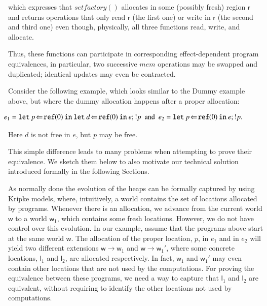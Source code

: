 \documentclass[orivec]{llncs}
\newif\iffull\fullfalse
\renewcommand{\paragraph}[1]{\noindent {\bf #1}}
\newcommand{\keywd}[1]{\mathtt{#1}}
\newcommand{\myref}[1]{\keywd{ref}(#1)}
\newcommand{\letin}[2]{\keywd{let}\:{#1}\!\Leftarrow\!{#2}\:\keywd{in}\:}
\newcommand{\regid}{\ensuremath{\mathsf{r}}}
\newcommand{\cloc}{\ensuremath{\mathsf{l}}\xspace}
\newcommand\w{\ensuremath{\mathsf{w}}\xspace}
\begin{document}
\noindent
which  expresses   that  $\textit{setfactory}()$  allocates   in  some
\fi
(possibly fresh) region $\regid$ and returns operations that only read
$\regid$ (the  first one)  or write  in $\regid$ (the  second and
third one)  even though, physically, all three  functions read, write,
and allocate.


Thus, these functions can participate in corresponding
effect-dependent program equivalences, in particular, two successive
$\textit{mem}$ operations may be swapped and duplicated; identical
updates may even be contracted.
\iffull\footnote{We
could
also consider a more object-oriented variant that works with
a basic type $\textit{set}_\regid$ accepted as argument by the
operations.}
\fi

\paragraph{Interleaved Dummy allocation}
Consider the following example, which looks similar to the Dummy example
above, but where the dummy allocation happens after a proper allocation:
\iffull
\[
\begin{array}{l}
 e_1 = \letin{p}{\myref{0}}\letin{d}{\myref{0}} e; !p ~\textrm{ and }~
 e_2 = \letin{p}{\myref{0}} e; !p.
\end{array} 
\]
Here $d$ is not free in $e$, but $p$ may be free.
\else

\(
\hspace{-4mm}
\begin{array}{l}
 e_1 = \letin{p}{\myref{0}}\letin{d}{\myref{0}} e; !p ~\textrm{ and }~
 e_2 = \letin{p}{\myref{0}} e; !p.
\end{array}
\)

\noindent
Here $d$ is not free in $e$, but $p$ may be free.
\fi
This simple difference leads to many problems when 
attempting to prove
their equivalence. We sketch them below to also motivate
our technical solution introduced formally in the following Sections. 

As normally done the
evolution of the heaps can be formally captured by using Kripke models,
where, intuitively, a world contains the set of locations allocated by
programs.
Whenever there is an allocation,
we advance from the current world $\w$ to a world $\w_1$, which contains
some fresh locations. However, we do not have control over this
evolution. In our example, assume that the programs above
start at the same world $\w$. The allocation of the proper location,
$p$,
in $e_1$ and in $e_2$ will yield two different extensions $\w \to \w_1$ and
$\w \to \w_1'$, where some concrete locations, $\cloc_1$ and $\cloc_2$, are
allocated respectively. In fact, $\w_1$ and $\w_1'$ may even contain other
locations that are not used by the computations. For proving the
equivalence between these programs, we need
a way to capture that $\cloc_1$  and $\cloc_2$ are equivalent, without
requiring to identify the other locations not used by computations.
\end{document}
